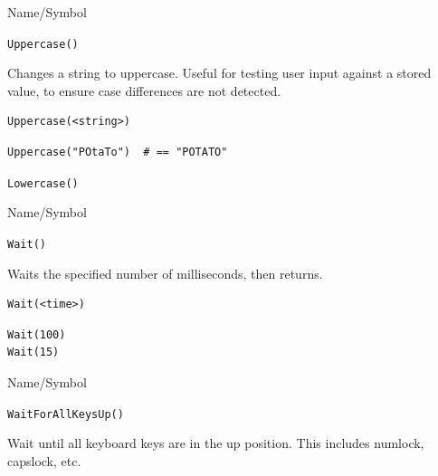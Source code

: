 \vfill
\newpage
{}
\vfill



\begin{desc}{Name/Symbol}
\item[Name/Symbol]  	\verb+Uppercase()+

\item[Description]  	Changes a string to uppercase.  Useful for testing user
	      	input against a stored value, to ensure case differences
	      	are not detected.

\item[Usage]
\begin{verbatim}
Uppercase(<string>)
\end{verbatim}

\item[Example]     
\begin{verbatim}
Uppercase("POtaTo")  # == "POTATO"
\end{verbatim}

\item[See Also]     	\verb+Lowercase()+
\end{desc}

\vfill
\newpage
{}
\vfill



\begin{desc}{Name/Symbol}
\item[Name/Symbol]  	\verb+Wait()+ 

\item[Description] 	Waits the specified number of milliseconds, then returns. 

\item[Usage]
\begin{verbatim}
Wait(<time>)
\end{verbatim}

\item[Example]
\begin{verbatim}
Wait(100)
Wait(15)
\end{verbatim}

\item[See Also]	
\end{desc}




\begin{desc}{Name/Symbol}
\item[Name/Symbol]  	\verb+WaitForAllKeysUp()+

\item[Description]	
               Wait until all keyboard keys are in the up
               position. This includes numlock, capslock, etc.
\item[Usage]		

\item[Example]	

\item[See Also]	

\end{desc}




